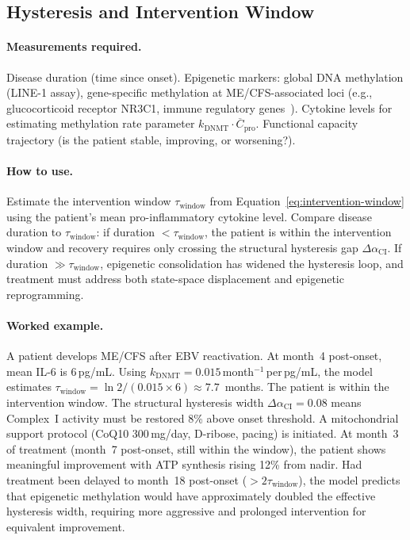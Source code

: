 \subsection{Hysteresis and Intervention Window}

\paragraph{Measurements required.}
Disease duration (time since onset). Epigenetic markers: global DNA methylation (LINE-1 assay), gene-specific methylation at ME/CFS-associated loci (e.g., glucocorticoid receptor NR3C1, immune regulatory genes~\cite{deVega2021dna_methylation}). Cytokine levels for estimating methylation rate parameter $k_{\text{DNMT}} \cdot \overline{C}_{\text{pro}}$. Functional capacity trajectory (is the patient stable, improving, or worsening?).

\paragraph{How to use.}
Estimate the intervention window $\tau_{\text{window}}$ from Equation~\ref{eq:intervention-window} using the patient's mean pro-inflammatory cytokine level. Compare disease duration to $\tau_{\text{window}}$: if duration $< \tau_{\text{window}}$, the patient is within the intervention window and recovery requires only crossing the structural hysteresis gap $\Delta\alpha_{\text{CI}}$. If duration $\gg \tau_{\text{window}}$, epigenetic consolidation has widened the hysteresis loop, and treatment must address both state-space displacement and epigenetic reprogramming.

\paragraph{Worked example.}
A patient develops ME/CFS after EBV reactivation. At month~4 post-onset, mean IL-6 is $6$\,pg/mL. Using $k_{\text{DNMT}} = 0.015$\,month$^{-1}$\,per\,pg/mL, the model estimates $\tau_{\text{window}} = \ln 2 / (0.015 \times 6) \approx 7.7$~months. The patient is within the intervention window. The structural hysteresis width $\Delta\alpha_{\text{CI}} = 0.08$ means Complex~I activity must be restored 8\% above onset threshold. A mitochondrial support protocol (CoQ10 300\,mg/day, D-ribose, pacing) is initiated. At month~3 of treatment (month~7 post-onset, still within the window), the patient shows meaningful improvement with ATP synthesis rising 12\% from nadir. Had treatment been delayed to month~18 post-onset ($> 2\tau_{\text{window}}$), the model predicts that epigenetic methylation would have approximately doubled the effective hysteresis width, requiring more aggressive and prolonged intervention for equivalent improvement.

